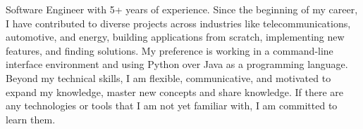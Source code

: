 

\begin{cvparagraph}

Software Engineer with 5+ years of experience. Since the beginning of my career, I have contributed to diverse projects across industries like telecommunications, automotive, and energy, building applications from scratch, implementing new features, and finding solutions. My preference is working in a command-line interface environment and using Python over Java as a programming language.\\
Beyond my technical skills, I am flexible, communicative, and motivated to expand my knowledge, master new concepts and share knowledge. If there are any technologies or tools that I am not yet familiar with, I am committed to learn them.

\end{cvparagraph}
